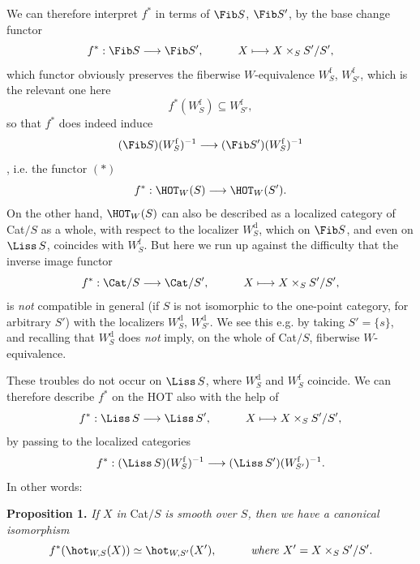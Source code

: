 We can therefore interpret $f^*$ in terms of $\Fib S$, $\Fib S'$, by the base change functor
\[f^* : \Fib S \longrightarrow \Fib S', \qquad\quad X \longmapsto X \times_S S'/S',\]
which functor obviously preserves the fiberwise $W$-equivalence $W_S^{\mathrm{f}}$, $W_{S'}^{\mathrm{f}}$, which is the relevant one here
\[f^*(W_S^{\mathrm{f}}) \subseteq W_{S'}^{\mathrm{f}},\]
so that $f^*$ does indeed induce
\[(\Fib S)(W_S^{\mathrm{f}})^{-1} \longrightarrow (\Fib S')(W_S^{\mathrm{f}})^{-1}\]
,
i.e. the functor $(*)$
\[f^* : \HOT_W(S) \longrightarrow \HOT_W(S').\]
On the other hand, $\HOT_W(S)$ can also be described as a localized category of Cat$/S$ as a whole, with respect to the localizer $W_S^{\mathrm{d}}$, which on $\Fib S$, and even on $\Liss\,S$, coincides with $W_S^{\mathrm{f}}$. But here we run up against the difficulty that the inverse image functor
\[f^* : \Cat/S \longrightarrow \Cat/S', \qquad\quad X \longmapsto X \times_S S'/S',\]
is \textit{not} compatible in general (if $S$ is not isomorphic to the one-point category, for arbitrary $S'$) with the localizers $W_S^{\mathrm{d}}$, $W_{S'}^{\mathrm{d}}$. We see this e.g. by taking $S' = \{s\}$, and recalling that $W_S^{\mathrm{d}}$ does \textit{not} imply, on the whole of Cat$/S$, fiberwise $W$-equivalence.

These troubles do not occur on $\Liss\,S$, where $W_S^{\mathrm{d}}$ and $W_S^{\mathrm{f}}$ coincide. We can therefore describe $f^*$ on the HOT also with the help of %
\[f^* : \Liss\,S \longrightarrow \Liss\,S', \qquad\quad X \longmapsto X \times_S S'/S',\]
by passing to the localized categories
\[f^* : (\Liss\,S)(W_S^{\mathrm{f}})^{-1} \longrightarrow (\Liss\,S')(W_{S'}^{\mathrm{f}})^{-1}.\]
In other words:

\textbf{Proposition 1.} \textit{If $X$ in} Cat$/S$ \textit{is smooth over $S$, then we have a canonical isomorphism}
\[f^*(\hot_{W,S}(X)) \simeq \hot_{W,S'}(X'), \qquad\quad \text{\textit{where} } X' = X \times_S S'/S'.\]
